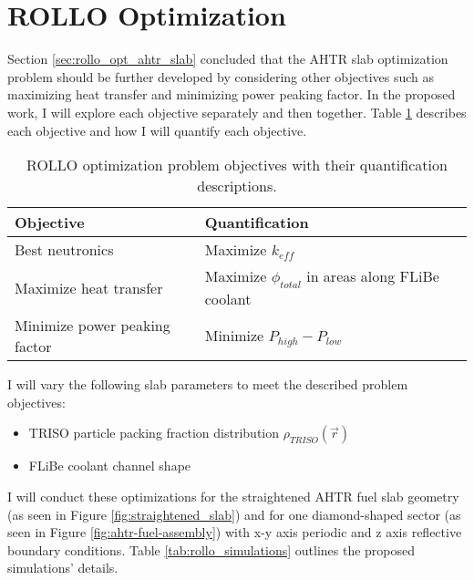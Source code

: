 \section{ROLLO Optimization}
Section \ref{sec:rollo_opt_ahtr_slab} concluded that the \gls{AHTR} slab 
optimization problem should be further developed by considering other objectives 
such as maximizing heat transfer and minimizing power peaking factor. 
In the proposed work, I will explore each objective separately and then together.
Table \ref{tab:objectives} describes each objective and how I will quantify 
each objective. 
\begin{table}[!htbp]
    \centering
    \onehalfspacing
    \caption{\acrfull{ROLLO} optimization problem objectives with their quantification 
    descriptions.}
	\label{tab:objectives}
    \footnotesize
    \begin{tabular}{p{5cm}p{7cm}}
    \hline 
    \textbf{Objective}& \textbf{Quantification}  \\
    \hline
    Best neutronics & Maximize $k_{eff}$\\ 
    Maximize heat transfer & Maximize $\phi_{total}$ in areas along FLiBe coolant \\
    Minimize power peaking factor & Minimize $P_{high}-P_{low}$ \\
    \hline
    \end{tabular}
\end{table}
I will vary the following slab parameters to meet the described problem objectives: 
\begin{itemize}
    \item \gls{TRISO} particle packing fraction distribution $\rho_{TRISO}(\vec{r})$
    \item \gls{FLiBe} coolant channel shape 
\end{itemize} 
I will conduct these optimizations for the straightened \gls{AHTR} fuel slab 
geometry (as seen in Figure \ref{fig:straightened_slab}) and for one 
diamond-shaped sector (as seen in Figure \ref{fig:ahtr-fuel-assembly}) with 
x-y axis periodic and z axis reflective boundary conditions. 
Table \ref{tab:rollo_simulations} outlines the proposed simulations' details. 
